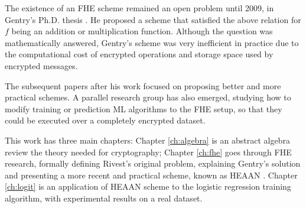 The existence of an FHE scheme remained an open problem until 2009, in Gentry's Ph.D. thesis \cite{gentry2009fully}. He proposed a scheme that satisfied the above relation for $f$ being an addition or multiplication function. Although the question was mathematically answered, Gentry's scheme was very inefficient in practice due to the computational cost of encrypted operations and storage space used by encrypted messages.

The subsequent papers after his work focused on proposing better and more practical schemes. A parallel research group has also emerged, studying how to modify training or prediction ML algorithms to the FHE setup, so that they could be executed over a completely encrypted dataset. 

This work has three main chapters: Chapter \ref{ch:algebra} is an abstract algebra review the theory needed for cryptography; Chapter \ref{ch:fhe} goes through FHE research, formally defining Rivest's original problem, explaining Gentry's solution and presenting a more recent and practical scheme, known as HEAAN \cite{ckks17}. Chapter \ref{ch:logit} is an application of HEAAN scheme to the logistic regression training algorithm, with experimental results on a real dataset.



